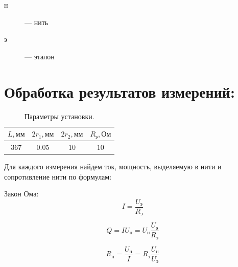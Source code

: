 \documentclass[a4paper,12pt]{article}
\begin{document}
\begin{description}
  \item[н] --- нить
  \item[э] --- эталон
\end{description}

\section{Обработка результатов измерений:}

\begin{table}[H]
  \begin{center}
    \begin{tabular}{|c|c|c|c|}
      \hline
      $L, \text{мм}$ & $2r_1, \text{мм}$ & $2r_2, \text{мм}$ & $R_{\text{э}}, \text{Ом}$
      \\\hline $367$ & $0.05$ & $10$ & $10$ \\\hline
    \end{tabular}
  \end{center}
  \caption{Параметры установки.\label{table:setup_pars}}
\end{table}

Для каждого измерения найдем ток, мощность, выделяемую в нити и сопротивление нити по формулам:

Закон Ома:
\begin{equation}
  I = \frac{U_{\text{э}}}{R_\text{э}}
\end{equation}

\begin{equation}
  Q = I U_{\text{н}} = U_{\text{н}} \frac{U_{\text{э}}}{R_{\text{э}}}
\end{equation}

\begin{equation}
  R_\text{н} = \frac{U_\text{н}}{I} =R_\text{э} \frac{U_\text{н}}{U_\text{э}}
\end{equation}
\end{document}
